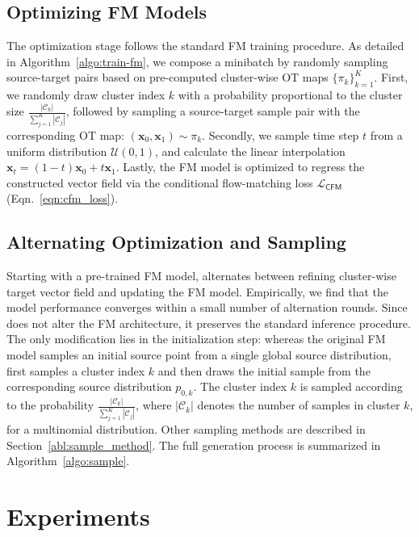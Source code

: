 \subsection{Optimizing FM Models}
The optimization stage follows the standard FM training procedure.  As detailed in Algorithm~\ref{algo:train-fm}, we compose a minibatch by randomly sampling source-target pairs based on pre-computed cluster-wise OT maps $\{\pi_k\}_{k=1}^K$.  First, we randomly draw cluster index $k$ with a probability proportional to the cluster size $\frac{|\mathcal{C}_k|}{\sum_{j=1}^K |\mathcal{C}_j|}$, followed by sampling a source-target sample pair with the corresponding OT map: $(\bm{x}_{0}, \bm{x}_{1}) \sim \pi_k$.  Secondly, we sample time step $t$ from a uniform distribution $\mathcal{U}(0, 1)$, and calculate the linear interpolation $\bm{x}_t=(1-t)\bm{x}_0 + t \bm{x}_1$.  Lastly, the FM model is optimized to regress the constructed vector field via the conditional flow-matching loss $\mathcal{L}_{\textsf{CFM}}$ (Eqn.~\ref{eqn:cfm_loss}).


\subsection{Alternating Optimization and Sampling} \label{sec:alternative_training}
Starting with a pre-trained FM model, \method{} alternates between refining cluster-wise target vector field and updating the FM model.  Empirically, we find that the model performance converges within a small number of alternation rounds.  Since \method{} does not alter the FM architecture, it preserves the standard inference procedure. The only modification lies in the initialization step: whereas the original FM model samples an initial source point from a single global source distribution, \method{} first samples a cluster index $k$ and then draws the initial sample from the corresponding source distribution $p_{0,k}$. The cluster index $k$ is sampled according to the probability $\frac{|\mathcal{C}_k|}{\sum_{j=1}^K |\mathcal{C}_j|}$, where $|\mathcal{C}_k|$ denotes the number of samples in cluster $k$, for a multinomial distribution.  
Other sampling methods are described in Section~\ref{abl:sample_method}. The full generation process is summarized in Algorithm~\ref{algo:sample}.

\section{Experiments}
\label{sec:experiments}

